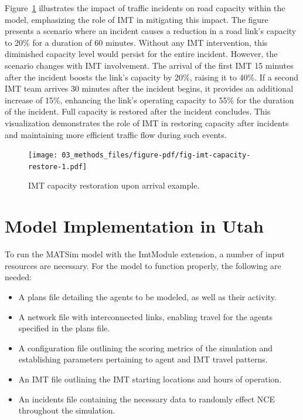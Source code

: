 \documentclass[fancy, oneside, mastersfancy, ms]{byuthesis}
\providecommand{\tightlist}{%
  \setlength{\itemsep}{0pt}\setlength{\parskip}{0pt}}\usepackage{longtable,booktabs,array}
\begin{document}
Figure~\ref{fig-imt-capacity-restore} illustrates the impact of traffic
incidents on road capacity within the model, emphasizing the role of IMT
in mitigating this impact. The figure presents a scenario where an
incident causes a reduction in a road link's capacity to 20\% for a
duration of 60 minutes. Without any IMT intervention, this diminished
capacity level would persist for the entire incident. However, the
scenario changes with IMT involvement. The arrival of the first IMT 15
minutes after the incident boosts the link's capacity by 20\%, raising
it to 40\%. If a second IMT team arrives 30 minutes after the incident
begins, it provides an additional increase of 15\%, enhancing the link's
operating capacity to 55\% for the duration of the incident. Full
capacity is restored after the incident concludes. This visualization
demonstrates the role of IMT in restoring capacity after incidents and
maintaining more efficient traffic flow during such events.

\begin{figure}

{\centering \texttt{[image: 03\_methods\_files/figure-pdf/fig-imt-capacity-restore-1.pdf]}

}

\caption{\label{fig-imt-capacity-restore}IMT capacity restoration upon
arrival example.}

\end{figure}

\hypertarget{sec-model_imp}{%
\section{Model Implementation in Utah}\label{sec-model_imp}}

To run the MATSim model with the ImtModule extension, a number of input
resources are necessary. For the model to function properly, the
following are needed:

\begin{itemize}
\tightlist
\item
  A plans file detailing the agents to be modeled, as well as their
  activity.
\item
  A network file with interconnected links, enabling travel for the
  agents specified in the plans file.
\item
  A configuration file outlining the scoring metrics of the simulation
  and establishing parameters pertaining to agent and IMT travel
  patterns.
\item
  An IMT file outlining the IMT starting locations and hours of
  operation.
\item
  An incidents file containing the necessary data to randomly effect NCE
  throughout the simulation.
\end{itemize}
\end{document}
